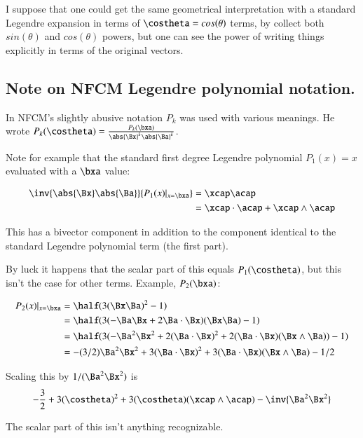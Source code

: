 I suppose that one could get the same geometrical interpretation with a standard Legendre expansion in terms of $\costheta = cos(\theta)$ terms, by collect both $sin(\theta)$ and $cos(\theta)$ powers, but one
can see the power of writing things explicitly in terms of the original vectors.

\subsection{ Note on NFCM Legendre polynomial notation. }

In NFCM's slightly abusive notation $P_k$ was used with various meanings.  He wrote $P_k(\costheta) = \frac{P_k(\bxa)}{\abs{\Bx}^k \abs{\Ba}^k}$.

Note for example that the standard first degree Legendre polynomial $P_1(x) = x$ evaluated with a $\bxa$ value:

\begin{align*}
\inv {\abs{\Bx}\abs{\Ba}} {P_1(x) \vert_{x=\bxa}} &= \xcap \acap \\
&= \xcap \cdot \acap + \xcap \wedge \acap \\
\end{align*}

This has a bivector component in addition to the component identical to the standard Legendre polynomial
term (the first part).

By luck it happens that the scalar part of this equals $P_1(\costheta)$, but this
isn't the case for other terms.  Example, $P_2(\bxa)$:

\begin{align*}
{P_2(x) \vert_{x=\bxa}} 
&= \half( 3(\Bx \Ba)^2 - 1 ) \\
&= \half( 3(-\Ba \Bx + 2 \Ba \cdot \Bx )(\Bx \Ba) - 1 ) \\
&= \half( 3(-\Ba^2 \Bx^2 + 2(\Ba \cdot \Bx)^2 + 2(\Ba \cdot \Bx)(\Bx \wedge \Ba)) - 1 ) \\
&=  -(3/2)\Ba^2 \Bx^2 + 3(\Ba \cdot \Bx)^2 + 3(\Ba \cdot \Bx)(\Bx \wedge \Ba) - 1/2  \\
\end{align*}

Scaling this by $1/(\Ba^2\Bx^2)$ is
\[
-\frac{3}{2} + 3(\costheta)^2 + 3(\costheta)(\xcap \wedge \acap) - \inv{\Ba^2\Bx^2} \\
\]

The scalar part of this isn't anything recognizable.
